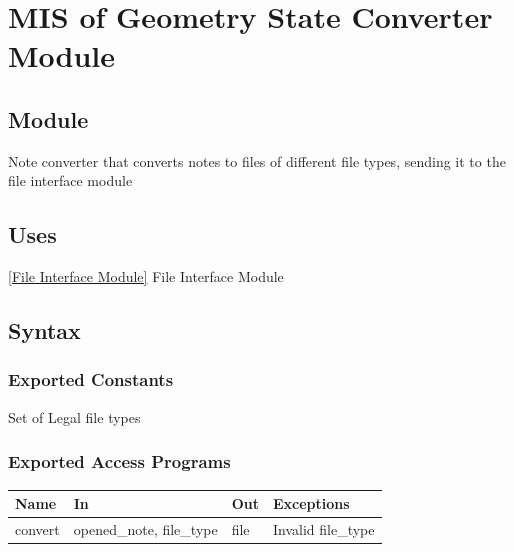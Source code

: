 \documentclass[12pt, titlepage]{article}
\begin{document}

\newpage
\section{MIS of {Geometry State Converter Module}} \label{Geometry State Converter Module}
%
%

\subsection{Module}

Note converter that converts notes to files of different file types, sending it to the file interface module

\subsection{Uses}
\ref{File Interface Module} {File Interface Module}

\subsection{Syntax}

\subsubsection{Exported Constants}
Set of Legal file types

\subsubsection{Exported Access Programs}

\begin{center}
\begin{tabular}{p{2cm} p{4cm} p{4cm} p{2cm}}
\hline
\textbf{Name} & \textbf{In} & \textbf{Out} & \textbf{Exceptions} \\
\hline
{convert} & opened\_note, file\_type & file & Invalid file\_type \\
\hline
\end{tabular}
\end{center}
\end{document}
